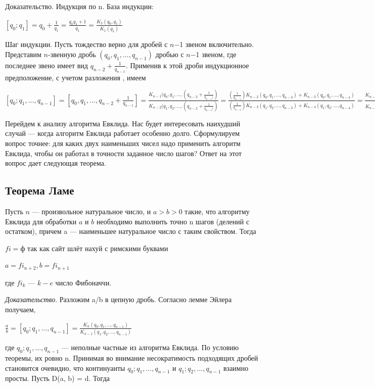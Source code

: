\documentclass[12pt]{article}
\begin{document}
            Доказательство. Индукция по n. База индукции:\par
        $[q_0;q_1] = q_0 + \frac{1}{q_1} = \frac{q_0q_1 + 1}{q_1} = \frac{K_2(q_0,q_1)}{K_1(q_1)}$\par
            Шаг индукции. Пусть тождество верно для дробей с $n$−1 звеном включительно. Представим $n$-звенную дробь $(q_0, q_1, . . . , q_{n−1})$ дробью с $n$−1 звеном, где последнее звено имеет вид $q_{n−2} + \frac{1}{q_{n-1}}$. Применив к этой дроби индукционное предположение, с учетом разложения , имеем\par
        $[q_0; q_1, . . . , q_{n−1}] = [q_0, q_1, . . . , q_{n−2} + \frac{1}{q_{n-1}}] = \frac{K_{n-1}(q_0, q_1, . . . , (q_{n-2}+\frac{1}{q_{n-1})})}{K_{n-2}(q_1, q_2, . . . , (q_{n-2}+\frac{1}{q_{n-1})})} = \frac{(\frac{1}{q_{n-1}}) K_{n-2}(q_0,q_1,...,q_{n-3})+K_{n-3}(q_0,q_1,...,q_{n-4})}{(\frac{1}{q_{n-1}}) K_{n-3}(q_1,q_2,...,q_{n-3})+K_{n-4}(q_1,q_2,...,q_{n-4})} = \frac{K_{n-1}(q_0,q_1,...,q_{n-2}) + \frac{K_{n-2}(q_0,q_1,...,q_{n-3})}{q_{n-1}}}{K_{n-2}(q_1,q_2,...,q_{n-2}) + \frac{K_{n-3}(q_1,q_2,...,q_{n-3})}{q_{n-1}}} = \frac{K_{n}(q_0,q_1,...,q_{n-1})}{K_{n-1}(q_1,q_2,...,q_{n-1})}$\par
            Перейдем к анализу алгоритма Евклида. Нас будет интересовать наихудший случай — когда алгоритм Евклида работает особенно долго. Сформулируем вопрос точнее: для каких двух наименьших чисел надо применить алгоритм Евклида, чтобы он работал в точности заданное число шагов? Ответ на этот вопрос дает следующая теорема.

            \subsection{Теорема Ламе}
            Пусть $n$ — произвольное натуральное число, и $a > b > 0$ такие, что алгоритму Евклида для обработки $a$ и $b$ необходимо выполнить точно n шагов (делений с остатком), причем a — наименьшее натуральное число с таким свойством. Тогда\par
        $fi = $ф так как сайт шлёт нахуй с римскими буквами \par
        $a = fi_{n+2}, b = fi_{n+1}$\par
            где $fi_k$ — $k-e$ число Фибоначчи.

            \textit{Доказательство}. Разложим a/b в цепную дробь. Согласно лемме Эйлера получаем,\par

        $\frac{a}{b} = [q_0; q_1,...,q_{n-1}]=\frac{K_{n}(q_0,q_1,...,q_{n-1})}{K_{n-1}(q_1,q_2,...,q_{n-1})}$\par
            где $q_0; q_1,...,q_{n-1}$ — неполные частные из алгоритма Евклида. По условию теоремы, их ровно n. Принимая во внимание несократимость подходящих
            дробей становится очевидно, что континуанты $q_0; q_1,...,q_{n-1}$ и $q_1; q_2,...,q_{n-1}$ взаимно просты. Пусть
            D(a, b) = d. Тогда\par
\end{document}
